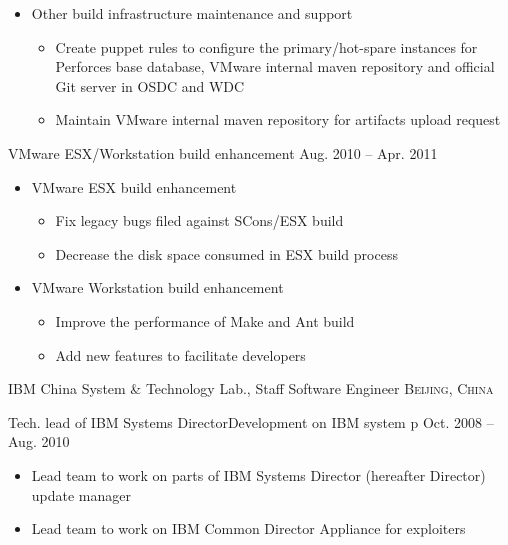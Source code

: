 \documentclass[10pt,letterpaper]{article}
\begin{document}
{{\begin{itemize}
\begin{itemize}
                \item   Maintain VMware legacy gitorious server and fix bugs
            \end{itemize}
        \item Other build infrastructure maintenance and support
            \begin{itemize}
                \item   Create puppet rules to configure the primary/hot-spare instances for
                    Perforces base database, VMware internal maven repository and official Git
                    server in OSDC and WDC
                \item   Maintain VMware internal maven repository for artifacts upload request
            \end{itemize}

    \end{itemize}
}
\headedsubsection %
{VMware ESX/Workstation build enhancement} {Aug. 2010 -- Apr. 2011}
{
    \begin{itemize}
        \item VMware ESX build enhancement
            \begin{itemize}
                \item   Fix legacy bugs filed against SCons/ESX build
                \item   Decrease the disk space consumed in ESX build process
            \end{itemize}
        \item VMware Workstation build enhancement
            \begin{itemize}
            \item   Improve the performance of Make and Ant build
            \item   Add new features to facilitate developers
            \end{itemize}
    \end{itemize}
}
}




\headedsection 
{IBM China System \& Technology Lab., Staff Software Engineer}
{\textsc{Beijing, China}} {

\headedsubsection %
{Tech. lead of IBM Systems Director\texttrademark Development on IBM system p}
{Oct. 2008 -- Aug. 2010}
{
    \begin{itemize}
        \item Lead team to work on parts of IBM Systems Director\texttrademark
            (hereafter Director) update manager
        \item Lead team to work on IBM Common Director Appliance for exploiters
    \end{itemize}
}
}
\end{document}
